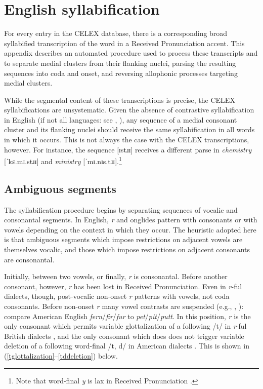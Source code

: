 \chapter{English syllabification}
\label{syllabification}

For every entry in the CELEX database, there is a corresponding broad syllabified transcription of the word in a Received Pronunciation accent. This appendix describes an automated procedure used to process these transcripts and to separate medial clusters from their flanking nuclei, parsing the resulting sequences into coda and onset, and reversing allophonic processes targeting medial clusters.

While the segmental content of these transcriptions is precise, the CELEX syllabifications are unsystematic. Given the absence of contrastive syllabification in English (if not all languages: see \citealp[221]{Blevins1995}, \citealp{Elfner2006}), any sequence of a medial consonant cluster and its flanking nuclei should receive the same syllabification in all words in which it occurs. This is not always the case with the CELEX transcriptions, however. For instance, the sequence [ɪstɹɪ] receives a different parse in \emph{chemistry} [ˈkɛ.mɪ.stɹɪ] and \emph{ministry} [ˈmɪ.nɪs.tɹɪ].\footnote{Note that word-final \emph{y} is lax in Received Pronunciation \citep[][II.294]{AOE}.}

\section{Ambiguous segments}

The syllabification procedure begins by separating sequences of vocalic and consonantal segments. In English, \emph{r} and onglides pattern with consonants or with vowels depending on the context in which they occur. The heuristic adopted here is that ambiguous segments which impose restrictions on adjacent vowels are themselves vocalic, and those which impose restrictions on adjacent consonants are consonantal.

Initially, between two vowels, or finally, \emph{r} is consonantal. Before another consonant, however, \emph{r} has been lost in Received Pronunciation. Even in \emph{r}-ful dialects, though, post-vocalic non-onset \emph{r} patterns with vowels, not coda consonants. Before non-onset \emph{r} many vowel contrasts are suspended (e.g., \citealp[269f.]{Fudge1969}, \citealp[][255]{Harris1994}): compare American English \emph{fern}/\emph{fir}/\emph{fur} to \emph{pet}/\emph{pit}/\emph{putt}. In this position, \emph{r} is the only consonant which permits variable glottalization of a following /t/ in \emph{r}-ful British dialects \citep[258]{Harris1994}, and the only consonant which does does not trigger variable deletion of a following word-final /t, d/ in American dialects \citep[8]{Guy1980}. This is shown in (\ref{tglottalization}--\ref{tddeletion}) below.

